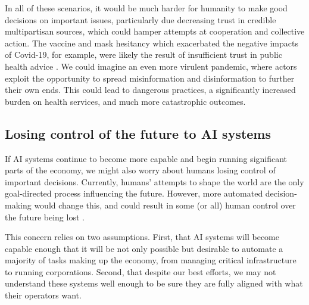 \documentclass{article}
\begin{document}
In all of these scenarios, it would be much harder for humanity to make good decisions on important issues, particularly due decreasing trust in credible multipartisan sources, which could hamper attempts at cooperation and collective action. The vaccine and mask hesitancy which exacerbated the negative impacts of Covid-19, for example, were likely the result of insufficient trust in public health advice \citep{seger_greatest_2021}. We could imagine an even more virulent pandemic, where actors exploit the opportunity to spread misinformation and disinformation to further their own ends. This could lead to dangerous practices, a significantly increased burden on health services, and much more catastrophic outcomes\citep{seger_tackling_2020}.

\subsection{Losing control of the future to AI systems}

If AI systems continue to become more capable and begin running significant parts of the economy, we might also worry about humans losing control of important decisions. Currently, humans’ attempts to shape the world are the only goal-directed process influencing the future. However, more automated decision-making would change this, and could result in some (or all) human control over the future being lost \citep{christiano_what_2019,critch_what_2021,ngo_agi_2020,russell_human_2019}.

This concern relies on two assumptions. First, that AI systems will become capable enough that it will be not only possible but desirable to automate a majority of tasks making up the economy, from managing critical infrastructure to running corporations. Second, that despite our best efforts, we may not understand these systems well enough to be sure they are fully aligned with what their operators want.
\end{document}
